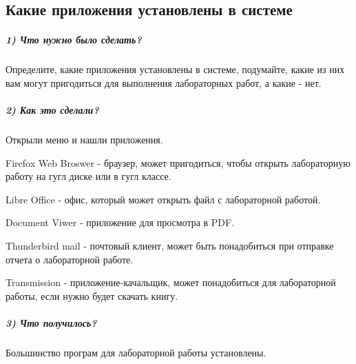 \subsection{Какие приложения установлены в системе}

\subparagraph{1) Что нужно было сделать?}

Определите, какие приложения установлены в системе, подумайте, какие из них вам могут пригодиться для выполнения лабораторных работ, а какие - нет.

\subparagraph{2) Как это сделали?}

Открыли меню и нашли приложения.

Firefox Web Broswer - браузер, может пригодиться, чтобы открыть лабораторную работу на гугл диске или в гугл классе.

Libre Office - офис, который может открыть файл с лабораторной работой.

Document Viwer - приложение для просмотра в PDF.

Thunderbird mail - почтовый клиент, может быть понадобиться при отправке отчета о лабораторной работе.

Transmission - приложение-качальщик, может понадобиться для лабораторной работы, если нужно будет скачать книгу.

\subparagraph{3) Что получилось?}

Большинство програм для лабораторной работы установлены.
